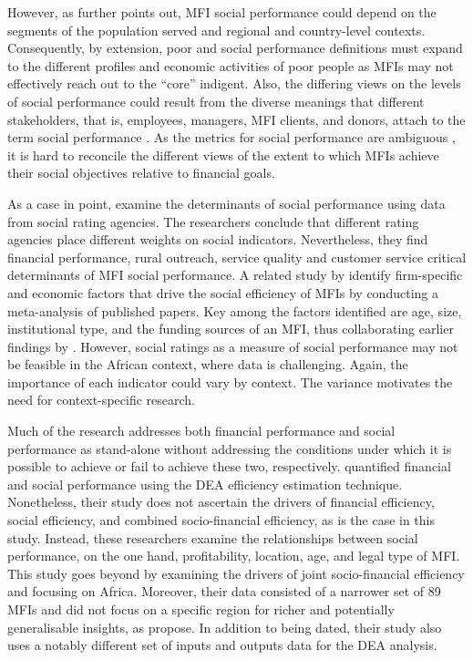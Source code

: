\documentclass[a4paper, nobind]{templates/ociamthesis}
\begin{document}
However, as \textcite{morduch2000microfinance} further points out, MFI social performance could depend on the segments of the population served and regional and country-level contexts. Consequently, by extension, poor and social performance definitions must expand to the different profiles and economic activities of poor people as MFIs may not effectively reach out to the ``core'' indigent. Also, the differing views on the levels of social performance could result from the diverse meanings that different stakeholders, that is, employees, managers, MFI clients, and donors, attach to the term social performance \autocite{marti2016financial}. As the metrics for social performance are ambiguous \autocite{nason2018behavioral}, it is hard to reconcile the different views of the extent to which MFIs achieve their social objectives relative to financial goals.

As a case in point, \textcite{beisland2020measuring} examine the determinants of social performance using data from social rating agencies. The researchers conclude that different rating agencies place different weights on social indicators. Nevertheless, they find financial performance, rural outreach, service quality and customer service critical determinants of MFI social performance. A related study by \textcite{hermes2018determinants} identify firm-specific and economic factors that drive the social efficiency of MFIs by conducting a meta-analysis of published papers. Key among the factors identified are age, size, institutional type, and the funding sources of an MFI, thus collaborating earlier findings by \textcite{gutierrez2009social}. However, social ratings as a measure of social performance may not be feasible in the African context, where data is challenging. Again, the importance of each indicator could vary by context. The variance motivates the need for context-specific research.

Much of the research addresses both financial performance and social performance as stand-alone without addressing the conditions under which it is possible to achieve or fail to achieve these two, respectively. \textcite{gutierrez2009social} quantified financial and social performance using the DEA efficiency estimation technique. Nonetheless, their study does not ascertain the drivers of financial efficiency, social efficiency, and combined socio-financial efficiency, as is the case in this study. Instead, these researchers examine the relationships between social performance, on the one hand, profitability, location, age, and legal type of MFI. This study goes beyond \textcite{gutierrez2009social} by examining the drivers of joint socio-financial efficiency and focusing on Africa. Moreover, their data consisted of a narrower set of 89 MFIs and did not focus on a specific region for richer and potentially generalisable insights, as \textcite{d2017ngos} propose. In addition to being dated, their study also uses a notably different set of inputs and outputs data for the DEA analysis.
\end{document}
